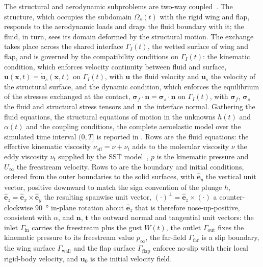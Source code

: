 The structural and aerodynamic subproblems are two-way coupled~\cite{bazilevs2013csfi,hou2012review}. The structure, which occupies the subdomain $\Omega_s(t)$ with the rigid wing and flap, responds to the aerodynamic loads and drags the fluid boundary with it; the fluid, in turn, sees its domain deformed by the structural motion. The exchange takes place across the shared interface $\Gamma_I(t)$, the wetted surface of wing and flap, and is governed by the compatibility conditions on $\Gamma_I(t)$: the kinematic condition, which enforces velocity continuity between fluid and surface, $\mathbf{u}(\mathbf{x},t) = \dot{\mathbf{u}}_s(\mathbf{x},t)$ on $\Gamma_I(t)$, with $\mathbf{u}$ the fluid velocity and $\dot{\mathbf{u}}_s$ the velocity of the structural surface, and the dynamic condition, which enforces the equilibrium of the stresses exchanged at the contact, $\boldsymbol{\sigma}_{f}\cdot\mathbf{n} = \boldsymbol{\sigma}_{s}\cdot\mathbf{n}$ on $\Gamma_I(t)$, with $\boldsymbol{\sigma}_{f}$, $\boldsymbol{\sigma}_{s}$ the fluid and structural stress tensors and $\mathbf{n}$ the interface normal. Gathering the fluid equations, the structural equations of motion in the unknowns $h(t)$ and $\alpha(t)$ and the coupling conditions, the complete aeroelastic model over the simulated time interval $(0,T]$ is reported in . Rows  are the fluid equations: the effective kinematic viscosity $\nu_{\mathrm{eff}}=\nu+\nu_t$ adds to the molecular viscosity $\nu$ the eddy viscosity $\nu_t$ supplied by the SST model~\cite{menter1994sst}, $p$ is the kinematic pressure and $U_\infty$ the freestream velocity. Rows  to  are the boundary and initial conditions, ordered from the outer boundaries to the solid surfaces, with $\hat{\mathbf e}_y$ the vertical unit vector, positive downward to match the sign convention of the plunge $h$, $\hat{\mathbf e}_z=\hat{\mathbf e}_x\times\hat{\mathbf e}_y$ the resulting spanwise unit vector, $(\cdot)^\perp=\hat{\mathbf e}_z\times(\cdot)$ a counter-clockwise \SI{90}{\degree} in-plane rotation about $\hat{\mathbf e}_z$ that is therefore nose-up-positive, consistent with $\alpha$, and $\mathbf n$, $\mathbf t$ the outward normal and tangential unit vectors: the inlet $\Gamma_{\mathrm{in}}$ carries the freestream plus the gust $W(t)$, the outlet $\Gamma_{\mathrm{out}}$ fixes the kinematic pressure to its freestream value $p_\infty$, the far-field $\Gamma_{\mathrm{far}}$ is a slip boundary, the wing surface $\Gamma_{\mathrm{wall}}$ and the flap surface $\Gamma_{\mathrm{flap}}$ enforce no-slip with their local rigid-body velocity, and $\mathbf{u}_0$ is the initial velocity field.



